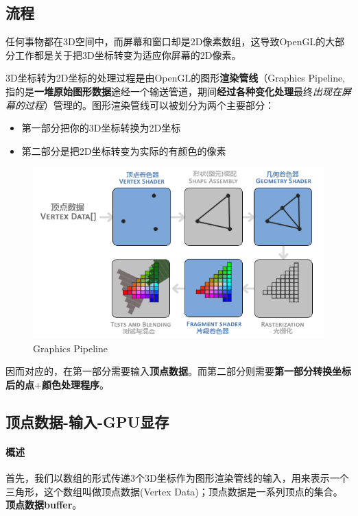 \documentclass[UTF8,a4paper,12pt]{ctexbook}
\begin{document}
		\subsection{流程}
			任何事物都在3D空间中，而屏幕和窗口却是2D像素数组，这导致OpenGL的大部分工作都是关于把3D坐标转变为适应你屏幕的2D像素。
			
			3D坐标转为2D坐标的处理过程是由OpenGL的图形\textbf{渲染管线}（Graphics Pipeline,指的是\textbf{一堆原始图形数据}途经一个输送管道，期间\textbf{经过各种变化处理}最终\textit{出现在屏幕的过程}）管理的。图形渲染管线可以被划分为两个主要部分：
				\begin{itemize}[itemindent = 1em]
					\item 第一部分把你的3D坐标转换为2D坐标
					\item 第二部分是把2D坐标转变为实际的有颜色的像素
				\end{itemize}
			
			\begin{figure}[H]
				\centering
				\includegraphics[width=.93\linewidth]{PipelineBase}
				\caption{Graphics Pipeline}
			\end{figure}

			
			因而对应的，在第一部分需要输入\textbf{顶点数据}。而第二部分则需要\textbf{第一部分转换坐标后的点}+\textbf{颜色处理程序}。
			
		
		\subsection{顶点数据-输入-GPU显存}
			
			\paragraph{概述}
				首先，我们以数组的形式传递3个3D坐标作为图形渲染管线的输入，用来表示一个三角形，这个数组叫做顶点数据(Vertex Data)；顶点数据是一系列顶点的集合。
				\textbf{顶点数据buffer}。
				
\end{document}
